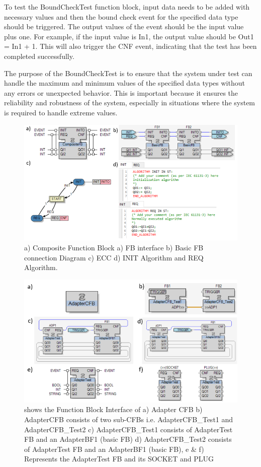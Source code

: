 \begin{bibunit}
To test the BoundCheckTest function block, input data needs to be added with necessary values and then the bound check event for the specified data type should be triggered. The output values of the event should be the input value plus one. For example, if the input value is In1, the output value should be Out1 = In1 + 1. This will also trigger the CNF event, indicating that the test has been completed successfully.

The purpose of the BoundCheckTest is to ensure that the system under test can handle the maximum and minimum values of the specified data types without any errors or unexpected behavior. This is important because it ensures the reliability and robustness of the system, especially in situations where the system is required to handle extreme values.


\begin{figure}[!b]
    \centering
    \includegraphics[width=\columnwidth]{MX_Papers/Paper8/Figures/CFBTest.PNG}
    \caption{a) Composite Function Block a) FB interface b) Basic FB connection Diagram c) ECC d) INIT Algorithm and REQ Algorithm.} 
    \label{fig:CFBTest}
\end{figure}

\begin{figure}[!b]
    \centering
    \includegraphics[width=\columnwidth]{MX_Papers/Paper8/Figures/AdapterCFB.PNG}
    \caption{ shows the Function Block Interface of a) Adapter CFB b) AdapterCFB consists of two sub-CFBs i.e. AdapterCFB\_Test1 and AdapterCFB\_Test2 c) AdapterCFB\_Test1 consists of AdapterTest FB and an AdapterBF1 (basic FB) d)  AdapterCFB\_Test2 consists of AdapterTest FB and an AdapterBF1 (basic FB), e \& f) Represents the  AdapterTest FB  and its SOCKET and PLUG } 
    \label{fig:AdapterCFB}
\end{figure}


\end{bibunit}
